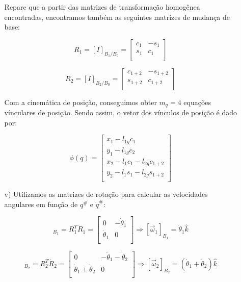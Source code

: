 \documentclass[12pt,a4paper]{article}
\begin{document}
\begin{itemize}
\begin{itemize}
	Repare que a partir das matrizes de transformação homogênea encontradas, encontramos também as seguintes matrizes de mudança de base:
	
	\begin{equation}
	R_1 = [I]_{B_1/B_0} =
	\begin{bmatrix}
	 c_1 & -s_1  \\
	 s_1 & c_1  \\
	\end{bmatrix}
	\end{equation}
	
	\begin{equation}
	R_2 = [I]_{B_2/B_0} =
	\begin{bmatrix}
	 c_{1+2} & -s_{1+2}  \\
	 s_{1+2} & c_{1+2}  \\
	\end{bmatrix}
	\end{equation}		

	Com a cinemática de posição, conseguimos obter $m_q = 4$ equações vínculares de posição. Sendo assim, o vetor dos vínculos de posição é dado por:
	
	
	\begin{equation}
	\phi(q)
	=
	\begin{bmatrix}
	x_1 - l_{1g} c_1 \\
	y_1 - l_{1g} c_2 \\
	x_2 - l_1 c_1 - l_{2g} c_{1+2} \\
	y_2 - l_1 s_1 - l_{2g} s_{1+2} \\
	\end{bmatrix}
	\end{equation}
	
	\item[v)] Utilizamos as matrizes de rotação para calcular as velocidades angulares em função de $q^{\#}$ e $\dot{q}^{\#}$:
	
	\begin{equation}
	[S(\vec{\omega}_1)]_{B_1} = R_1^T \dot{R}_1 =
	\begin{bmatrix}
	0 & -\dot{\theta}_1  \\
	\dot{\theta}_1 & 0  \\
	\end{bmatrix}
	\Rightarrow
	[\vec{\omega}_1]_{B_1} = \dot{\theta}_1 \hat{k}
	\end{equation}
	
	\begin{equation}
	[S(\vec{\omega}_2)]_{B_2} = R_2^T \dot{R}_2 =
	\begin{bmatrix}
	0 & -\dot{\theta}_1 -\dot{\theta}_2 \\
	\dot{\theta}_1 + \dot{\theta}_2 & 0  \\
	\end{bmatrix}
	\Rightarrow
	[\vec{\omega}_2]_{B_2} = (\dot{\theta}_1 + \dot{\theta}_2) \hat{k}
	\end{equation}
	

\end{itemize}
\end{itemize}
\end{document}
